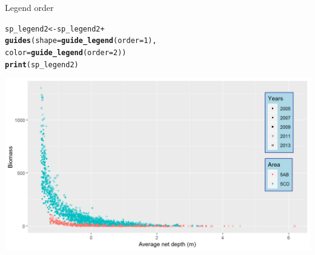 \documentclass{beamer}\usepackage[]{graphicx}\usepackage[]{color}
\makeatletter
\newcommand{\hlnum}[1]{\textcolor[rgb]{0.686,0.059,0.569}{#1}}%
\newcommand{\hlopt}[1]{\textcolor[rgb]{0,0,0}{#1}}%
\newcommand{\hlstd}[1]{\textcolor[rgb]{0.345,0.345,0.345}{#1}}%
\newcommand{\hlkwb}[1]{\textcolor[rgb]{0.69,0.353,0.396}{#1}}%
\newcommand{\hlkwc}[1]{\textcolor[rgb]{0.333,0.667,0.333}{#1}}%
\newcommand{\hlkwd}[1]{\textcolor[rgb]{0.737,0.353,0.396}{\textbf{#1}}}%
\newenvironment{kframe}{%
 \def\at@end@of@kframe{}%
 \ifinner\ifhmode%
  \def\at@end@of@kframe{\end{minipage}}%
  \begin{minipage}{\columnwidth}%
 \fi\fi%
 \def\FrameCommand##1{\hskip\@totalleftmargin \hskip-\fboxsep
 \colorbox{shadecolor}{##1}\hskip-\fboxsep
     \hskip-\linewidth \hskip-\@totalleftmargin \hskip\columnwidth}%
 \MakeFramed {\advance\hsize-\width
   \@totalleftmargin\z@ \linewidth\hsize
   \@setminipage}}%
 {\par\unskip\endMakeFramed%
 \at@end@of@kframe}
\newenvironment{knitrout}{}{} %
\makeatother
\begin{document}
\begin{frame}[fragile]{Legend order}
\begin{knitrout}\footnotesize
{}\color{fgcolor}\begin{kframe}
\begin{alltt}
\hlstd{sp_legend2} \hlkwb{<-} \hlstd{sp_legend2}  \hlopt{+}
  \hlkwd{guides}\hlstd{(}\hlkwc{shape} \hlstd{=} \hlkwd{guide_legend}\hlstd{(}\hlkwc{order}\hlstd{=}\hlnum{1}\hlstd{),}
         \hlkwc{color} \hlstd{=} \hlkwd{guide_legend}\hlstd{(}\hlkwc{order}\hlstd{=}\hlnum{2}\hlstd{))}
\hlkwd{print}\hlstd{(sp_legend2)}
\end{alltt}
\end{kframe}

{\centering \includegraphics[width=.9\linewidth]{figure/legend_order-1} 

}



\end{knitrout}
\end{frame}
\end{document}
